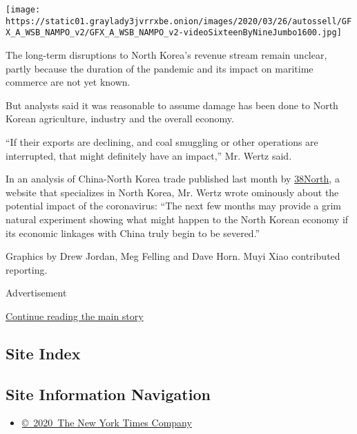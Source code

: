 \texttt{[image: https://static01.graylady3jvrrxbe.onion/images/2020/03/26/autossell/GFX\_A\_WSB\_NAMPO\_v2/GFX\_A\_WSB\_NAMPO\_v2-videoSixteenByNineJumbo1600.jpg]}

The long-term disruptions to North Korea's revenue stream remain
unclear, partly because the duration of the pandemic and its impact on
maritime commerce are not yet known.

But analysts said it was reasonable to assume damage has been done to
North Korean agriculture, industry and the overall economy.

``If their exports are declining, and coal smuggling or other operations
are interrupted, that might definitely have an impact,'' Mr. Wertz said.

In an analysis of China-North Korea trade published last month by
\href{https://www.38north.org/2020/02/dwertz022520/}{38North}, a website
that specializes in North Korea, Mr. Wertz wrote ominously about the
potential impact of the coronavirus: ``The next few months may provide a
grim natural experiment showing what might happen to the North Korean
economy if its economic linkages with China truly begin to be severed.''

Graphics by Drew Jordan, Meg Felling and Dave Horn. Muyi Xiao
contributed reporting.

Advertisement

\protect\hyperlink{after-bottom}{Continue reading the main story}

\hypertarget{site-index}{%
\subsection{Site Index}\label{site-index}}

\hypertarget{site-information-navigation}{%
\subsection{Site Information
Navigation}\label{site-information-navigation}}

\begin{itemize}
\tightlist
\item
  \href{https://help.nytimes3xbfgragh.onion/hc/en-us/articles/115014792127-Copyright-notice}{©~2020~The
  New York Times Company}
\end{itemize}

